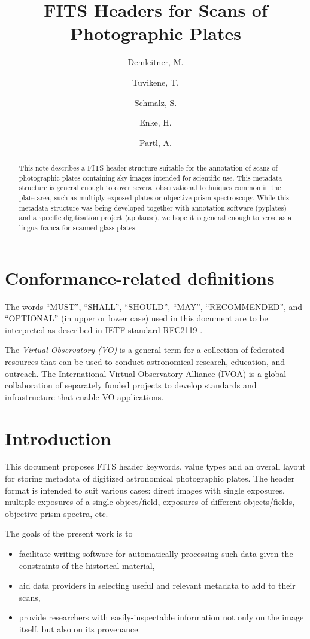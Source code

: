 \documentclass[11pt]{ivoa}
\title{FITS Headers for Scans of Photographic Plates}
\author{Demleitner, M.}
\author{Tuvikene, T.}
\author{Schmalz, S.}
\author{Enke, H.}
\author{Partl, A.}
\begin{document}
\begin{abstract}
This note describes a FITS header structure suitable for the annotation
of scans of photographic plates containing sky images intended for
scientific use.  This metadata structure is general enough to cover
several observational techniques common in the plate area, such as
multiply exposed plates or objective prism spectroscopy.  While this
metadata structure was being developed together with annotation software
(pyplates) and a specific digitisation project
(applause), we hope it is general enough to serve as a lingua franca for
scanned glass plates.

\end{abstract}


\section*{Conformance-related definitions}

The words ``MUST'', ``SHALL'', ``SHOULD'', ``MAY'', ``RECOMMENDED'', and
``OPTIONAL'' (in upper or lower case) used in this document are to be
interpreted as described in IETF standard RFC2119 \citep{std:RFC2119}.

The \emph{Virtual Observatory (VO)} is a
general term for a collection of federated resources that can be used
to conduct astronomical research, education, and outreach.
The \href{https://www.ivoa.net}{International
Virtual Observatory Alliance (IVOA)} is a global
collaboration of separately funded projects to develop standards and
infrastructure that enable VO applications.


\section{Introduction}

This document  proposes FITS \citep{std:FITS} header keywords, value
types and an overall layout for storing metadata of digitized
astronomical photographic plates. The header format is intended to suit
various cases: direct images with single exposures, multiple exposures
of a single object/field, exposures of different objects/fields,
objective-prism spectra, etc.

The goals of the present work is to 

\begin{itemize}
\item facilitate writing software for automatically processing such data
given the constraints of the historical material,

\item aid data providers in selecting useful and relevant metadata to
add to their scans,

\item provide researchers with easily-inspectable information not only
on the image itself, but also on its provenance.
\end{itemize}
\end{document}
